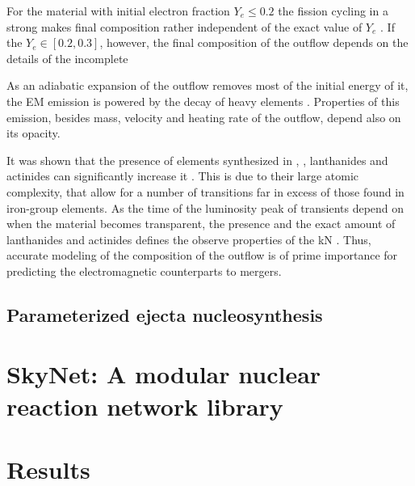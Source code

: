 For the material with initial electron fraction $Y_e\leq 0.2$ the fission cycling in a strong \rproc{} makes final composition rather independent of the exact value of $Y_e$ \citep{Metzger:2010,Roberts:2011,Goriely:2011vg}. 
If the $Y_e\in[0.2,0.3]$, however, the final composition of the outflow depends on the details of the incomplete \rproc{} \nuc{} \citep{Korobkin:2012uy,Grossman:2013lqa,Kasen:2014toa}

As an adiabatic expansion of the outflow removes most of the initial energy of it, the \ac{EM} emission is powered by the decay of heavy elements \citep{Metzger:2010}. 
Properties of this emission, besides mass, velocity and heating rate of the outflow, depend also on its opacity. 


%
It was shown that the presence of elements synthesized in \rproc{}, \eg, lanthanides and actinides can significantly increase it \citep{Kasen:2013xka,Tanaka:2013ana}. 
This is due to their large atomic complexity, that allow for a number of transitions far in excess of those found in iron-group elements. 
As the time of the luminosity peak of transients depend on when the material becomes transparent, the presence and the exact amount of lanthanides and actinides defines the observe properties of the \ac{kN} \citep{Barnes:2013wka,Tanaka:2013ana}. 
%
Thus, accurate modeling of the composition of the outflow is of prime importance for predicting the electromagnetic counterparts to mergers. 


\subsection{Parameterized ejecta nucleosynthesis}




\section{SkyNet: A modular nuclear reaction network library}




\section{Results}








